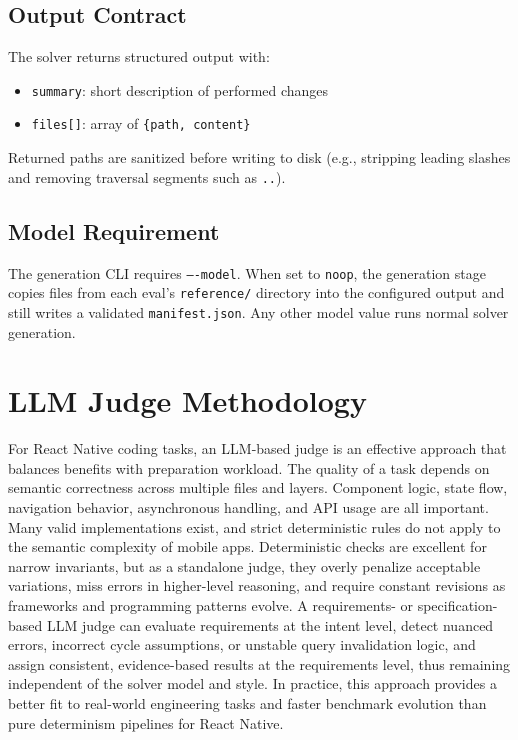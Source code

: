 \documentclass[11pt]{article}
\begin{document}
\subsection{Output Contract}
The solver returns structured output with:
\begin{itemize}
  \item \texttt{summary}: short description of performed changes
  \item \texttt{files[]}: array of \texttt{\{path, content\}}
\end{itemize}

Returned paths are sanitized before writing to disk (e.g., stripping leading slashes and removing traversal segments such as \texttt{..}).

\subsection{Model Requirement}
The generation CLI requires \texttt{----model}. When set to \texttt{noop}, the generation stage copies files from each eval's \texttt{reference/} directory into the configured output and still writes a validated \texttt{manifest.json}. Any other model value runs normal solver generation.

\section{LLM Judge Methodology}

For React Native coding tasks, an LLM-based judge is an effective approach that balances benefits with preparation workload. The quality of a task depends on semantic correctness across multiple files and layers. Component logic, state flow, navigation behavior, asynchronous handling, and API usage are all important. Many valid implementations exist, and strict deterministic rules do not apply to the semantic complexity of mobile apps. Deterministic checks are excellent for narrow invariants, but as a standalone judge, they overly penalize acceptable variations, miss errors in higher-level reasoning, and require constant revisions as frameworks and programming patterns evolve. A requirements- or specification-based LLM judge can evaluate requirements at the intent level, detect nuanced errors, incorrect cycle assumptions, or unstable query invalidation logic, and assign consistent, evidence-based results at the requirements level, thus remaining independent of the solver model and style. In practice, this approach provides a better fit to real-world engineering tasks and faster benchmark evolution than pure determinism pipelines for React Native.
\end{document}
